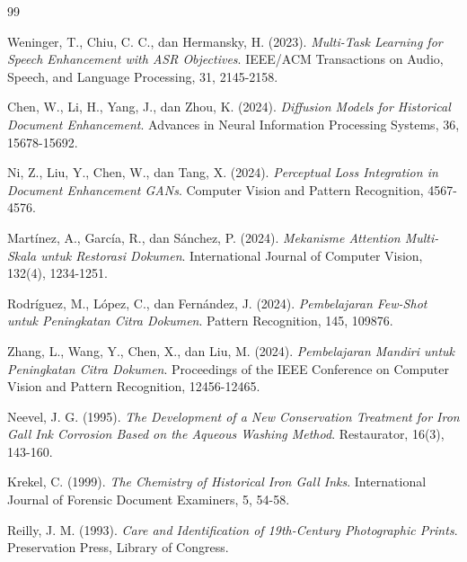 \documentclass[12pt,a4paper]{book}
\begin{document}
\begin{thebibliography}{99}

Weninger, T., Chiu, C. C., dan Hermansky, H. (2023).
\textit{Multi-Task Learning for Speech Enhancement with ASR Objectives}.
IEEE/ACM Transactions on Audio, Speech, and Language Processing, 31, 2145-2158.


Chen, W., Li, H., Yang, J., dan Zhou, K. (2024).
\textit{Diffusion Models for Historical Document Enhancement}.
Advances in Neural Information Processing Systems, 36, 15678-15692.

Ni, Z., Liu, Y., Chen, W., dan Tang, X. (2024).
\textit{Perceptual Loss Integration in Document Enhancement GANs}.
Computer Vision and Pattern Recognition, 4567-4576.

Martínez, A., García, R., dan Sánchez, P. (2024).
\textit{Mekanisme Attention Multi-Skala untuk Restorasi Dokumen}.
International Journal of Computer Vision, 132(4), 1234-1251.

Rodríguez, M., López, C., dan Fernández, J. (2024).
\textit{Pembelajaran Few-Shot untuk Peningkatan Citra Dokumen}.
Pattern Recognition, 145, 109876.

Zhang, L., Wang, Y., Chen, X., dan Liu, M. (2024).
\textit{Pembelajaran Mandiri untuk Peningkatan Citra Dokumen}.
Proceedings of the IEEE Conference on Computer Vision and Pattern Recognition, 12456-12465.


Neevel, J. G. (1995).
\textit{The Development of a New Conservation Treatment for Iron Gall Ink Corrosion Based on the Aqueous Washing Method}.
Restaurator, 16(3), 143-160.

Krekel, C. (1999).
\textit{The Chemistry of Historical Iron Gall Inks}.
International Journal of Forensic Document Examiners, 5, 54-58.

Reilly, J. M. (1993).
\textit{Care and Identification of 19th-Century Photographic Prints}.
Preservation Press, Library of Congress.


\end{thebibliography}
\end{document}
